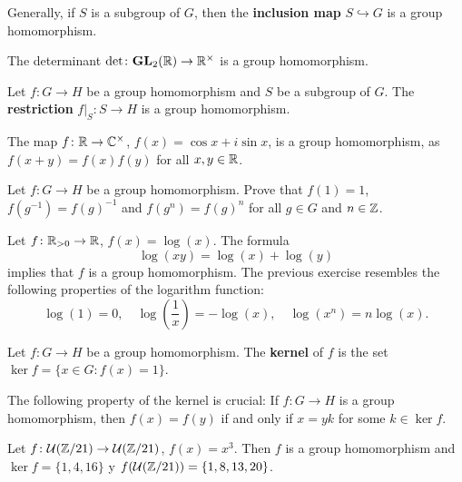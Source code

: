 Generally, if $S$ is a subgroup of $G$, 
then the \textbf{inclusion map}  $S\hookrightarrow G$ is a group
homomorphism. 

\begin{example}
The determinant $\det\colon\mathbf{GL}_2(\mathbb{R})\to\mathbb{R}^\times$ is a group homomorphism. 
\end{example}

\begin{example}
    Let $f\colon G\to H$ be a group homomorphism and
    $S$ be a subgroup of $G$.
    The \textbf{restriction} $f|_S\colon S\to H$ is a group homomorphism. 
\end{example}

\begin{example}
The map $f\colon\mathbb{R}\to\mathbb{C}^\times$, $f(x)=\cos x+i\sin x$, is a group
homomorphism, as 
$f(x+y)=f(x)f(y)$ for all $x,y\in\mathbb{R}$.
\end{example}

\begin{exercise}
Let $f\colon G\to H$ be a group homomorphism. Prove that 
$f(1)=1$, $f(g^{-1})=f(g)^{-1}$ and 
$f(g^n)=f(g)^n$ for all $g\in G$ and $n\in\mathbb{Z}$.
\end{exercise}

\begin{example}
Let $f\colon\mathbb{R}_{>0}\to\mathbb{R}$, $f(x)=\log(x)$. The formula 
\[\log(xy)=\log(x)+
\log(y)
\]
implies that $f$ is a group homomorphism. 
The previous exercise resembles 
the following properties of the logarithm function: 
\[
\log(1)=0,
\quad
\log\left(\frac{1}{x}\right)=-\log(x),
\quad
\log(x^n)=n\log(x).
\]
\end{example}

\begin{definition}
        Let $f\colon G\to H$ be a group homomorphism. The \textbf{kernel} of $f$
        is the set 
        $\ker f=\{x\in G:f(x)=1\}$.
\end{definition}

The following property of the kernel is crucial: If $f\colon G\to H$
is a group homomorphism, then 
$f(x)=f(y)$ if and only if $x=yk$ for some $k\in\ker f$.

\begin{example}
Let $f\colon\mathcal{U}(\mathbb{Z}/21)\to\mathcal{U}(\mathbb{Z}/21)$, $f(x)=x^3$. 
Then $f$ is a group homomorphism and 
$\ker f=\{1,4,16\}$ y $f(\mathcal{U}(\mathbb{Z}/21))=\{1,8,13,20\}$.
\end{example}

